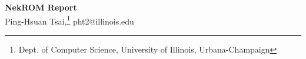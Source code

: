 \documentclass[11pt]{article}
\begin{document}
\setlength{\parindent}{0.25in}

\medskip                        %

\thispagestyle{plain}
\begin{center}                  %
   \textbf{\Large NekROM Report}
   \\[2ex]
Ping-Hsuan Tsai,\footnote{Dept. of Computer Science, University of Illinois, Urbana-Champaign}
pht2@illinois.edu \\
\end{center}


% 

\nocite{*}


\end{document}
